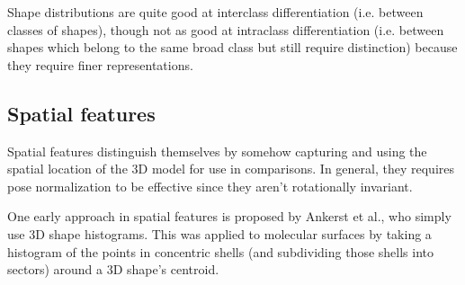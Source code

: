 \documentclass[../tech_report_1.tex]{subfiles}
\begin{document}
Shape distributions are quite good at interclass differentiation (i.e. between classes of shapes), though not as good at intraclass differentiation\cite{tangelder2008survey} (i.e. between shapes which belong to the same broad class but still require distinction) because they require finer representations.

\subsection{Spatial features}

Spatial features distinguish themselves by somehow capturing and using the spatial location of the 3D model for use in comparisons. In general, they requires pose normalization to be effective since they aren't rotationally invariant.

One early approach in spatial features is proposed by Ankerst et al.\cite{ankerst19993d}, who simply use 3D shape histograms. This was applied to molecular surfaces by taking a histogram of the points in concentric shells (and subdividing those shells into sectors) around a 3D shape's centroid.
\end{document}
